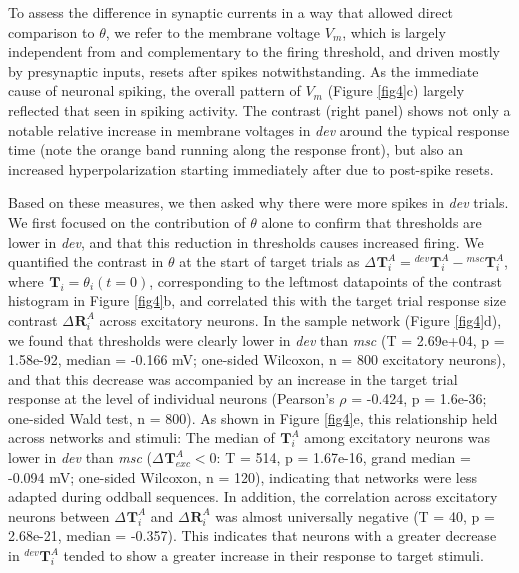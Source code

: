 \documentclass[pdflatex,referee,iicol,sn-basic]{sn-jnl}
\newcommand{\dev}{\textit{dev}}
\newcommand{\msc}{\textit{msc}}
\renewcommand{\R}[3][]{{}^{#1}_{}\mathbf{R}^{#2}_{#3}}
\renewcommand{\T}[3][]{{}^{#1}_{}\mathbf{T}^{#2}_{#3}}
\newcommand{\refpanel}[2]{Figure \ref{fig#1}\lowercase{#2}}
\begin{document}
To assess the difference in synaptic currents in a way that allowed direct comparison to $\theta$, we refer to the membrane voltage $V_m$, which is largely independent from and complementary to the firing threshold, and driven mostly by presynaptic inputs, resets after spikes notwithstanding. As the immediate cause of neuronal spiking, the overall pattern of $V_m$ (\refpanel{4}{c}) largely reflected that seen in spiking activity. The contrast (right panel) shows not only a notable relative increase in membrane voltages in \dev{} around the typical response time (note the orange band running along the response front), but also an increased hyperpolarization starting immediately after due to post-spike resets.

Based on these measures, we then asked why there were more spikes in \dev{} trials. We first focused on the contribution of $\theta$ alone to confirm that thresholds are lower in \dev{}, and that this reduction in thresholds causes increased firing. We quantified the contrast in $\theta$ at the start of target trials as $\Delta \T{A}{i} = \T[dev]{A}{i} - \T[msc]{A}{i}$, where $\T{}{i} = \theta_i(t=0)$, corresponding to the leftmost datapoints of the contrast histogram in \refpanel{4}{b}, and correlated this with the target trial response size contrast $\Delta \R{A}{i}$ across excitatory neurons. In the sample network (\refpanel{4}{d}), we found that thresholds were clearly lower in \dev{} than \msc{} (T = 2.69e+04, p = 1.58e-92, median = -0.166 mV; one-sided Wilcoxon, n = 800 excitatory neurons), and that this decrease was accompanied by an increase in the target trial response at the level of individual neurons (Pearson's $\rho$ = -0.424, p = 1.6e-36; one-sided Wald test, n = 800). As shown in \refpanel{4}{e}, this relationship held across networks and stimuli: The median of $\T{A}{i}$ among excitatory neurons was lower in \dev{} than \msc{} ($\Delta \T{A}{exc} < 0$: T = 514, p = 1.67e-16, grand median = -0.094 mV; one-sided Wilcoxon, n = 120), indicating that networks were less adapted during oddball sequences. In addition, the correlation across excitatory neurons between $\Delta \T{A}{i}$ and $\Delta \R{A}{i}$ was almost universally negative (T = 40, p = 2.68e-21, median = -0.357). This indicates that neurons with a greater decrease in $\T[dev]{A}{i}$ tended to show a greater increase in their response to target stimuli.
\end{document}
